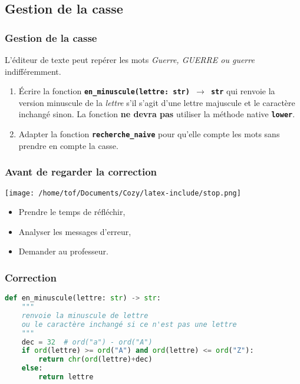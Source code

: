 \documentclass[svgnames,11pt]{beamer}
\begin{document}
\subsection{Gestion de la casse}
\begin{frame}
    \frametitle{Gestion de la casse}

    L'éditeur de texte peut repérer les mots \emph{Guerre, GUERRE ou guerre} indifféremment.
    \begin{activite}
    \begin{enumerate}
        \item Écrire la fonction \textbf{\texttt{en\_minuscule(lettre: str) $\rightarrow$ str}} qui renvoie la version minuscule de la \emph{lettre} s'il s'agit d'une lettre majuscule et le caractère inchangé sinon. La fonction \textbf{ne devra pas} utiliser la méthode native \textbf{\texttt{lower}}.
        \item Adapter la fonction \textbf{\texttt{recherche\_naive}} pour qu'elle compte les mots sans prendre en compte la casse.
    \end{enumerate}
    \end{activite}

\end{frame}
\begin{frame}
    \frametitle{Avant de regarder la correction}
\begin{center}
    \centering
    \texttt{[image: /home/tof/Documents/Cozy/latex-include/stop.png]}
    \end{center}
{\Large
    \begin{itemize}
        \item Prendre le temps de réfléchir,
        \item Analyser les messages d'erreur,
        \item Demander au professeur.
    \end{itemize}
}
\end{frame}
\begin{frame}[fragile]
    \frametitle{Correction}

    \begin{center}
    \begin{lstlisting}[language=Python , basicstyle=\small, xleftmargin=1em, xrightmargin=1em]
def en_minuscule(lettre: str) -> str:
    """
    renvoie la minuscule de lettre
    ou le caractère inchangé si ce n'est pas une lettre
    """
    dec = 32  # ord("a") - ord("A")
    if ord(lettre) >= ord("A") and ord(lettre) <= ord("Z"):
        return chr(ord(lettre)+dec)
    else:
        return lettre
\end{lstlisting}
    \end{center}

\end{frame}
\end{document}
